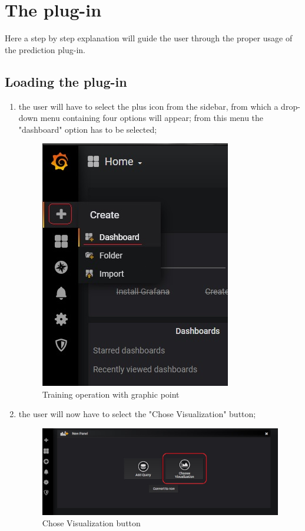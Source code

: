 \section{The plug-in}
Here a step by step explanation will guide the user through the proper usage of the prediction plug-in.

\subsection{Loading the plug-in}
\begin{enumerate}
	\item the user will have to select the plus icon from the sidebar, from which a drop-down menu containing four options will appear; from this menu the "dashboard" option has to be selected;


\begin{figure}[H]
\centering
\includegraphics[scale=0.90]{img/plug-in/plus_dash.png}
\caption{Training operation with graphic point}
\end{figure}


	\item the user will now have to select the "Chose Visualization" button;


\begin{figure}[H]
\centering
\includegraphics[scale=0.65]{img/plug-in/visual.png}
\caption{Chose Visualization button}
\end{figure}



\end{enumerate}
